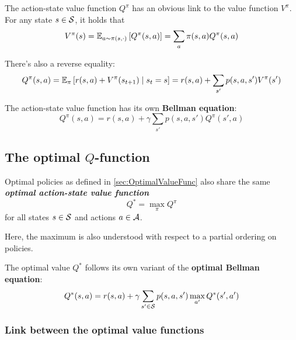 \documentclass[../course-notes.tex]{subfiles}
\begin{document}
The action-state value function $Q^\pi$ has an obvious link to the value function $V^\pi$.
For any state $s\in\mathcal{S}$, it holds that
\begin{equation}\label{eq:ValueFunctionExpectationLink}
	V^\pi(s) = \operatorname{\mathbb{E}}_{a\sim \pi(s,\cdot)}\left[
	Q^\pi(s, a)
	\right]
	= \sum_a \pi(s,a) Q^\pi(s,a)
\end{equation}

There's also a reverse equality:
\begin{equation}
	Q^\pi(s,a) =
	\operatorname{\mathbb{E}}_{\pi}\left[
		r(s,a) + V^\pi(s_{t+1})
		\;\middle|\; s_t = s
	\right]
	=
	r(s, a) + \sum_{s'} p(s,a,s') V^\pi(s')
\end{equation}

The action-state value function has its own \textbf{\bluefont Bellman equation}:
\begin{equation}
	Q^\pi(s,a) = r(s,a) + \gamma
	\sum_{s'} p(s,a,s') Q^\pi(s',a)
\end{equation}


\subsection{The optimal $Q$-function}

\begin{defn}
	Optimal policies as defined in \cref{sec:OptimalValueFunc} also share the same \emph{\bfseries\bluefont optimal action-state value function}
	\begin{equation}
		Q^* = \max_\pi Q^\pi
	\end{equation}
	for all states $s\in\mathcal{S}$ and actions $a\in\mathcal{A}$.	
\end{defn}

Here, the maximum is also understood with respect to a partial ordering on policies.

The optimal value $Q^*$ follows its own variant of the \textbf{\bluefont optimal Bellman equation}:
\begin{equation}\label{eq:QValOptimalBellmanEqn}
	Q^*(s,a) = r(s,a) + 
	\gamma\sum_{s'\in\mathcal{S}} p(s,a,s') \max_{a'} Q^*(s',a')
\end{equation}


\subsubsection{Link between the optimal value functions}
\end{document}
